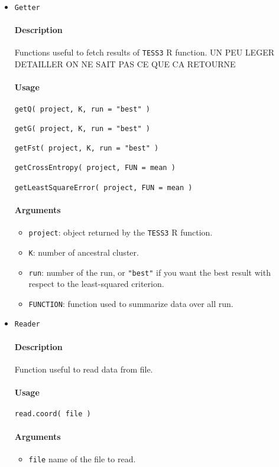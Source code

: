 \documentclass[10pt,a4paper]{article}
\begin{document}
\begin{itemize}
\item \verb|Getter|

\paragraph{Description}
Functions useful to fetch results of \verb|TESS3| R function. UN PEU LEGER DETAILLER ON NE SAIT PAS CE QUE CA RETOURNE
\paragraph{Usage}
\begin{Verbatim}
getQ( project, K, run = "best" )
 
getG( project, K, run = "best" )
  
getFst( project, K, run = "best" )
  
getCrossEntropy( project, FUN = mean ) 

getLeastSquareError( project, FUN = mean )
\end{Verbatim}
\paragraph{Arguments}
\begin{itemize}
\item \verb|project|: object returned by the \verb|TESS3| R function.
\item \verb|K|: number of ancestral cluster.
\item \verb|run|: number of the run, or \verb|"best"| if you want the best result with respect to the least-squared criterion.
\item \verb|FUNCTION|: function used to summarize data over all run.

\end{itemize}

\item \verb|Reader|

\paragraph{Description}
Function useful to read data from file.
\paragraph{Usage}
\begin{verbatim}
read.coord( file )
\end{verbatim}
\paragraph{Arguments}
\begin{itemize}
\item \verb|file| name of the file to read.
\end{itemize}


\end{itemize}
\end{document}
